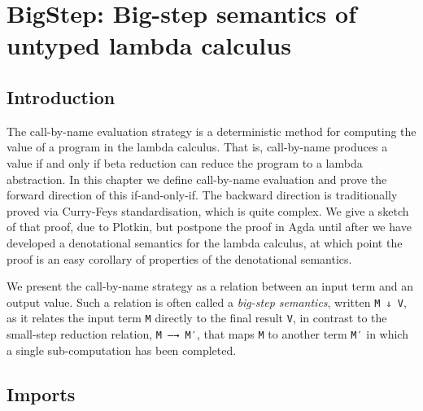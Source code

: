 \hypertarget{BigStep}{%
\chapter{BigStep: Big-step semantics of untyped lambda
calculus}\label{BigStep}}

\begin{fence}
\begin{code}%
\>[0]\AgdaSpace{}%
\AgdaSpace{}%
\<%
\end{code}
\end{fence}

\hypertarget{introduction}{%
\section{Introduction}\label{introduction}}

The call-by-name evaluation strategy is a deterministic method for
computing the value of a program in the lambda calculus. That is,
call-by-name produces a value if and only if beta reduction can reduce
the program to a lambda abstraction. In this chapter we define
call-by-name evaluation and prove the forward direction of this
if-and-only-if. The backward direction is traditionally proved via
Curry-Feys standardisation, which is quite complex. We give a sketch of
that proof, due to Plotkin, but postpone the proof in Agda until after
we have developed a denotational semantics for the lambda calculus, at
which point the proof is an easy corollary of properties of the
denotational semantics.

We present the call-by-name strategy as a relation between an input term
and an output value. Such a relation is often called a \emph{big-step
semantics}, written \texttt{M\ ⇓\ V}, as it relates the input term
\texttt{M} directly to the final result \texttt{V}, in contrast to the
small-step reduction relation, \texttt{M\ —→\ M′}, that maps \texttt{M}
to another term \texttt{M′} in which a single sub-computation has been
completed.

\hypertarget{imports}{%
\section{Imports}\label{imports}}

